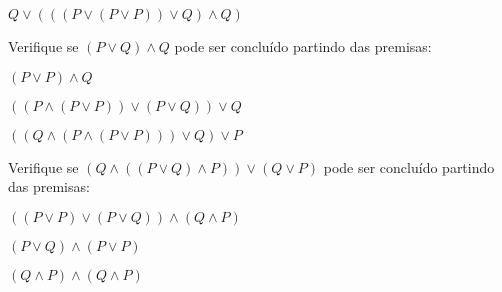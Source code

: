 \documentclass{lib/unichristusdoc}
\begin{document}
\subproblem $  Q \lor ( ( ( P \lor ( P \lor P ) ) \lor Q ) \land Q )  $

\vspace{1cm}\problem Verifique se $  ( P \lor Q ) \land Q  $ pode ser concluído partindo das premisas: 

\subproblem $  ( P \lor P ) \land Q  $

\subproblem $  ( ( P \land ( P \lor P ) ) \lor ( P \lor Q ) ) \lor Q  $

\subproblem $  ( ( Q \land ( P \land ( P \lor P ) ) ) \lor Q ) \lor P  $

\vspace{1cm}\problem Verifique se $  ( Q \land ( ( P \lor Q ) \land P ) ) \lor ( Q \lor P )  $ pode ser concluído partindo das premisas: 

\subproblem $  ( ( P \lor P ) \lor ( P \lor Q ) ) \land ( Q \land P )  $

\subproblem $  ( P \lor Q ) \land ( P \lor P )  $

\subproblem $  ( Q \land P ) \land ( Q \land P )  $
\end{document}

